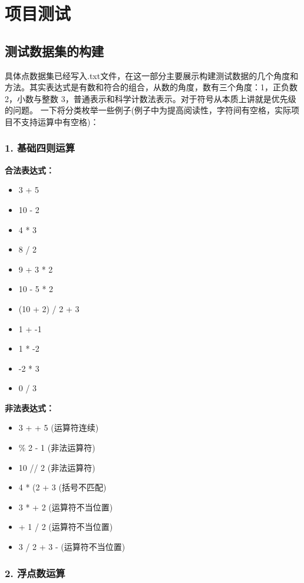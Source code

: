 \documentclass[fontset=fandol]{ctexart}
\begin{document}
\section{项目测试}
\subsection{测试数据集的构建}
具体点数据集已经写入.txt文件，在这一部分主要展示构建测试数据的几个角度和方法。其实表达式是有数和符合的组合，从数的角度，数有三个角度：1，正负数 2，小数与整数 3，普通表示和科学计数法表示。对于符号从本质上讲就是优先级的问题。
一下将分类枚举一些例子(例子中为提高阅读性，字符间有空格，实际项目不支持运算中有空格)：
\subsubsection*{1. 基础四则运算}
\textbf{合法表达式：}
\begin{itemize}
  \item 3 + 5
  \item 10 - 2
  \item 4 * 3
  \item 8 / 2
  \item 9 + 3 * 2
  \item 10 - 5 * 2
  \item (10 + 2) / 2 + 3
  \item 1 + -1
  \item 1 * -2
  \item -2 * 3
  \item 0 / 3
\end{itemize}

\textbf{非法表达式：}
\begin{itemize}
  \item 3 + + 5 \quad (运算符连续)
  \item \% 2 - 1 \quad (非法运算符)
  \item 10 // 2 \quad (非法运算符)
  \item 4 * (2 + 3 \quad (括号不匹配)
  \item 3 * + 2 \quad (运算符不当位置)
  \item + 1 / 2 \quad (运算符不当位置)
  \item 3 / 2 + 3 - \quad (运算符不当位置)
\end{itemize}

\subsubsection*{2. 浮点数运算}
\end{document}
